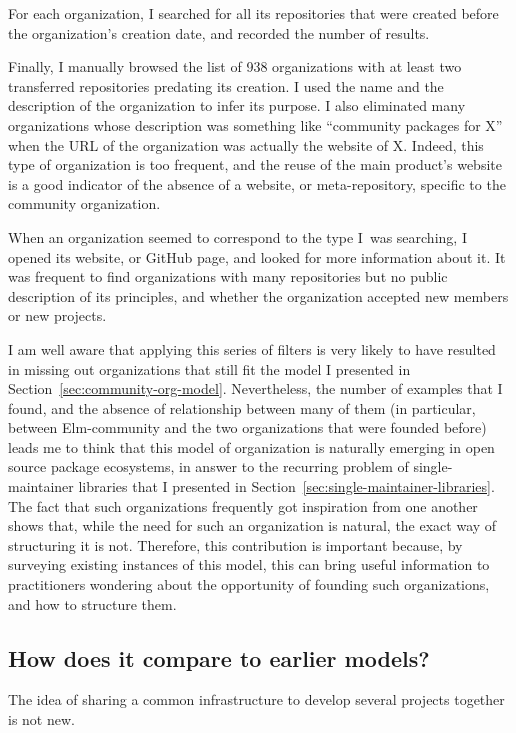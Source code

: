 For each organization, I searched for all its repositories that were created before the organization's creation date, and recorded the number of results.

Finally, I manually browsed the list of 938 organizations with at least two transferred repositories predating its creation.
I used the name and the description of the organization to infer its purpose.
I also eliminated many organizations whose description was something like ``community packages for X'' when the URL of the organization was actually the website of X.
Indeed, this type of organization is too frequent, and the reuse of the main product's website is a good indicator of the absence of a website, or meta-repository, specific to the community organization.

When an organization seemed to correspond to the type I was searching, I opened its website, or GitHub page, and looked for more information about it.
It was frequent to find organizations with many repositories but no public description of its principles, and whether the organization accepted new members or new projects.

I am well aware that applying this series of filters is very likely to have resulted in missing out organizations that still fit the model I presented in Section~\ref{sec:community-org-model}.
Nevertheless, the number of examples that I found, and the absence of relationship between many of them (in particular, between Elm-community and the two organizations that were founded before) leads me to think that this model of organization is naturally emerging in open source package ecosystems, in answer to the recurring problem of single-maintainer libraries that I presented in Section~\ref{sec:single-maintainer-libraries}.
The fact that such organizations frequently got inspiration from one another shows that, while the need for such an organization is natural, the exact way of structuring it is not.
Therefore, this contribution is important because, by surveying existing instances of this model, this can bring useful information to practitioners wondering about the opportunity of founding such organizations, and how to structure them.

\subsection{How does it compare to earlier models?}

The idea of sharing a common infrastructure to develop several projects together is not new.


